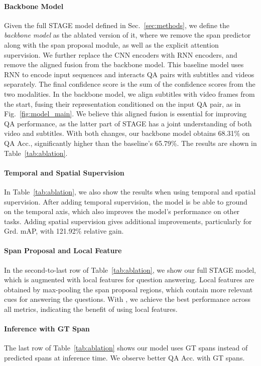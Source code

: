 \documentclass[11pt,a4paper]{article}
\begin{document}
\paragraph{Backbone Model} 
Given the full STAGE model defined in Sec.~\ref{sec:methods}, we define the \textit{backbone model} as the ablated version of it, where we remove the span predictor along with the span proposal module, as well as the explicit attention supervision.
We further replace the CNN encoders with RNN encoders, and remove the aligned fusion from the backbone model. 
This baseline model uses RNN to encode input sequences and interacts QA pairs with subtitles and videos separately. The final confidence score is the sum of the confidence scores from the two modalities. 
In the backbone model, we align subtitles with video frames from the start, fusing their representation conditioned on the input QA pair, as in Fig.~\ref{fig:model_main}.
We believe this aligned fusion is essential for improving QA performance, as the latter part of STAGE has a joint understanding of both video and subtitles. 
With both changes, our backbone model obtains 68.31\% on QA Acc., significantly higher than the baseline's 65.79\%. The results are shown in Table~\ref{tab:ablation}.


\paragraph{Temporal and Spatial Supervision} 
In Table~\ref{tab:ablation}, we also show the results when using temporal and spatial supervision. After adding temporal supervision, the model is be able to ground on the temporal axis, which also improves the model's performance on other tasks. Adding spatial supervision gives additional improvements, particularly for Grd. mAP, with 121.92\% relative gain.


\paragraph{Span Proposal and Local Feature} 
In the second-to-last row of Table~\ref{tab:ablation}, we show our full STAGE model, which is augmented with local features  for question answering. 
Local features are obtained by max-pooling the span proposal regions, which contain more relevant cues for answering the questions. 
With , we achieve the best performance across all metrics, indicating the benefit of using local features. 

\paragraph{Inference with GT Span} 
The last row of Table~\ref{tab:ablation} shows our model uses GT spans instead of predicted spans at inference time. We observe better QA Acc. with GT spans.
\end{document}
